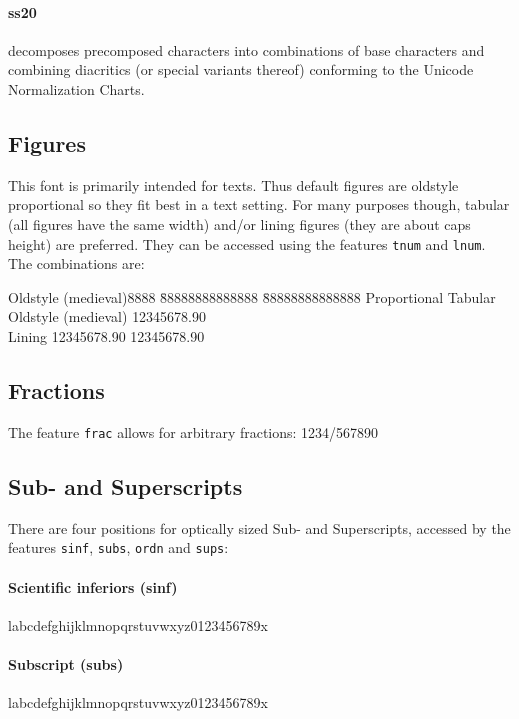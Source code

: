 \documentclass[pagesize,DIV14]{scrartcl}
\begin{document}
\paragraph*{ss20} decomposes precomposed characters into combinations of base characters and combining diacritics (or special variants thereof) conforming to the Unicode Normalization Charts.

\subsection{Figures}
This font is primarily intended for texts. Thus default figures are oldstyle proportional so they fit best in a text setting. For many purposes though, tabular (all figures have the same width) and/or lining figures (they are about caps height) are preferred. They can be accessed using the features \texttt{tnum} and \texttt{lnum}.
The combinations are:
\begin{tabbing}
 Oldstyle (medieval)8888 \= 88888888888888  \= 88888888888888 \kill
  \> Proportional \> Tabular \\
 Oldstyle (medieval)  \> {12345678.90} \\
 Lining		\> {12345678.90} \> {12345678.90} \\
\end{tabbing}



\subsection{Fractions}
The feature \texttt{frac} allows for arbitrary fractions: { 1234/567890}

\subsection{Sub- and Superscripts}
There are four positions for optically sized Sub- and Superscripts, accessed by the features \texttt{sinf}, \texttt{subs}, \texttt{ordn} and \texttt{sups}:
\paragraph*{Scientific inferiors (sinf)} l{abcdefghijklmnopqrstuvwxyz0123456789}x
\paragraph*{Subscript (subs)} l{abcdefghijklmnopqrstuvwxyz0123456789}x
\end{document}

